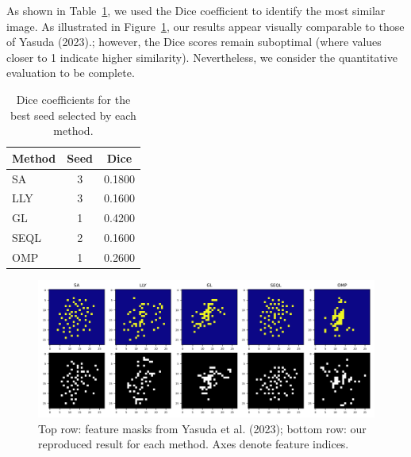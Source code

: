 \documentclass[a4paper,twocolumn]{article} %
\begin{document}
As shown in Table~\ref{tab:dice_results}, we used the Dice coefficient to identify the most similar image. As illustrated in Figure~\ref{fig:feature_masks}, our results appear visually comparable to those of Yasuda (2023).; however, the Dice scores remain suboptimal (where values closer to 1 indicate higher similarity). Nevertheless, we consider the quantitative evaluation to be complete.
\begin{table}[ht]
    \centering
    \begin{tabular}{lcc}
        \hline
        \textbf{Method} & \textbf{Seed} & \textbf{Dice} \\
        \hline
        SA    & 3 & 0.1800 \\
        LLY   & 3 & 0.1600 \\
        GL    & 1 & 0.4200 \\
        SEQL  & 2 & 0.1600 \\
        OMP   & 1 & 0.2600 \\
        \hline
    \end{tabular}
    \caption{Dice coefficients for the best seed selected by each method.}
    \label{tab:dice_results}
\end{table}
\begin{figure}[h!]
    \centering
    \includegraphics[width=\textwidth]{figures/all_methods_with_axis.png}
    \caption{Top row: feature masks from Yasuda et al. (2023); bottom row: our reproduced result for each method. Axes denote feature indices.}
    \label{fig:feature_masks}
\end{figure}
\end{document}
